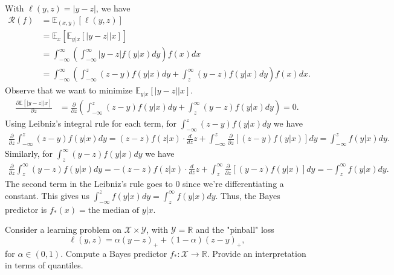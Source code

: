 \begin{tcolorbox}[title=Solution, breakable]
\noindent With $\ell(y,z) = |y-z|$, we have 
\begin{align*}
    \mathcal{R}(f) &= \mathbb{E}_{(x,y)}[\ell(y,z)] \\
    &= \mathbb{E}_x[\mathbb{E}_{y|x}[|y-z||x]] \\
    &= \int_{-\infty}^{\infty} \left( \int_{-\infty}^{\infty}|y-z|f(y|x)dy \right)f(x)dx\\
    &=\int_{-\infty}^{\infty} \left( \int_{-\infty}^z(z-y)f(y|x)dy + \int_{z}^{\infty}(y-z)f(y|x)dy \right) f(x)dx.
\end{align*}
Observe that we want to minimize $\mathbb{E}_{y|x}[|y-z||x]$. 
\begin{align*}
    \frac{\partial\mathbb{E}[|y-z||x]}{\partial z} &= \frac{\partial}{\partial z}\left(\int_{-\infty}^z(z-y)f(y|x)dy + \int_{z}^{\infty}(y-z)f(y|x)dy\right)=0.
\end{align*}
Using Leibniz's integral rule for each term, for $\int_{-\infty}^z(z-y)f(y|x)dy$ we have
\begin{align*}
    \frac{\partial}{\partial z} \int_{-\infty}^z(z-y)f(y|x)dy = (z-z)f(z|x)\cdot\frac{d}{dz}z+ \int_{-\infty}^z\frac{\partial}{\partial z}[(z-y)f(y|x)]dy = \int_{-\infty}^zf(y|x)dy.
\end{align*}
Similarly, for $\int_{z}^{\infty}(y-z)f(y|x)dy$ we have
\begin{align*}
    \frac{\partial}{\partial z} \int_{z}^{\infty}(y-z)f(y|x)dy = -(z-z)f(z|x)\cdot\frac{d}{dz}z + \int_{z}^{\infty}\frac{\partial}{\partial z}[(y-z)f(y|x)]dy = -\int_{z}^{\infty}f(y|x)dy.
\end{align*}
The second term in the Leibniz's rule goes to 0 since we're differentiating a constant. This gives us $\int_{-\infty}^{z}f(y|x)dy = \int_z^{\infty}f(y|x)dy$. Thus, the Bayes predictor is $f_{*}(x)=\text{the median of }y|x$.
\end{tcolorbox}

\begin{exercise}[2.3]
Consider a learning problem on $\mathcal{X} \times \mathcal{Y}$, with $\mathcal{Y} = \mathbb{R}$ and the "pinball" loss
$$
\ell(y,z) = \alpha(y-z)_+ + (1-\alpha)(z-y)_+,
$$
for $\alpha \in (0,1)$. Compute a Bayes predictor $f_* : \mathcal{X} \to \mathbb{R}$. Provide an interpretation in terms of quantiles.
\end{exercise}

